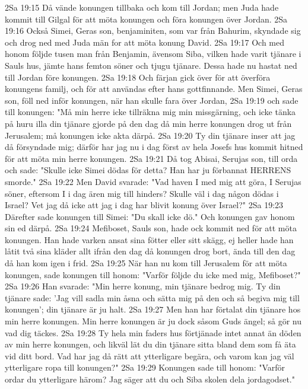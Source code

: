 2Sa 19:15  Då vände konungen tillbaka och kom till Jordan; men Juda hade kommit till Gilgal för att möta konungen och föra konungen över Jordan.
2Sa 19:16  Också Simei, Geras son, benjaminiten, som var från Bahurim, skyndade sig och drog ned med Juda män for att möta konung David.
2Sa 19:17  Och med honom följde tusen man från Benjamin, ävensom Siba, vilken hade varit tjänare i Sauls hus, jämte hans femton söner och tjugu tjänare. Dessa hade nu hastat ned till Jordan före konungen.
2Sa 19:18  Och färjan gick över för att överföra konungens familj, och för att användas efter hans gottfinnande. Men Simei, Geras son, föll ned inför konungen, när han skulle fara över Jordan,
2Sa 19:19  och sade till konungen: "Må min herre icke tillräkna mig min missgärning, och icke tänka på huru illa din tjänare gjorde på den dag då min herre konungen drog ut från Jerusalem; må konungen icke akta därpå.
2Sa 19:20  Ty din tjänare inser att jag då försyndade mig; därför har jag nu i dag först av hela Josefs hus kommit hitned för att möta min herre konungen.
2Sa 19:21  Då tog Abisai, Serujas son, till orda och sade: "Skulle icke Simei dödas för detta? Han har ju förbannat HERRENS smorde."
2Sa 19:22  Men David svarade: "Vad haven I med mig att göra, I Serujas söner, eftersom I i dag ären mig till hinders? Skulle väl i dag någon dödas i Israel? Vet jag då icke att jag i dag har blivit konung över Israel?"
2Sa 19:23  Därefter sade konungen till Simei: "Du skall icke dö." Och konungen gav honom sin ed därpå.
2Sa 19:24  Mefiboset, Sauls son, hade ock kommit ned för att möta konungen. Han hade varken ansat sina fötter eller sitt skägg, ej heller hade han låtit två sina kläder allt ifrån den dag då konungen drog bort, ända till den dag då han kom igen i frid.
2Sa 19:25  När han nu kom till Jerusalem för att möta konungen, sade konungen till honom: "Varför följde du icke med mig, Mefiboset?"
2Sa 19:26  Han svarade: "Min herre konung, min tjänare bedrog mig. Ty din tjänare sade: 'Jag vill sadla min åsna och sätta mig på den och så begiva mig till konungen'; din tjänare är ju halt.
2Sa 19:27  Men han har förtalat din tjänare hos min herre konungen. Min herre konungen är ju dock såsom Guds ängel; så gör nu vad dig täckes.
2Sa 19:28  Ty hela min faders hus förtjänade intet annat än döden av min herre konungen, och likväl lät du din tjänare sitta bland dem som få äta vid ditt bord. Vad har jag då rätt att ytterligare begära, och varom kan jag väl ytterligare ropa till konungen?"
2Sa 19:29  Konungen sade till honom: "Varför ordar du ytterligare härom? Jag säger att du och Siba skolen dela jordagodset."
